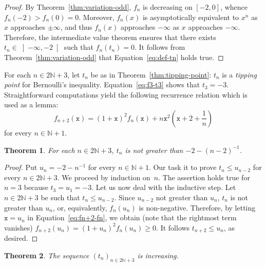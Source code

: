 \documentclass[12pt]{article}
\newcommand{\bN}{\mathbb{N}}
\newcommand{\ltint}[1]{\left]- \infty, #1 \right[}
\newcommand{\ttx}{\mathtt{x}}
\newtheorem{theorem}{Theorem}
\begin{document}
 \begin{proof}
   By Theorem~\ref{thm:variation-odd},  $f_n$ is decreasing on $[- 2, 0]$,
   whence   $f_n(- 2) > f_n(0) = 0$.
   Moreover, $f_n(x)$ is asymptotically equivalent to $x^n$ as $x$ approaches $\pm \infty$,
   and thus $f_n(x)$ approaches $- \infty$ as $x$ approaches $- \infty$.
   Therefore, the intermediate value theorem ensures that there exists $t_n \in \ltint{- 2}$ such that $f_n(t_n) = 0$.
   It follows from Theorem~\ref{thm:variation-odd} that Equation~\eqref{eq:def-tn} holds true.
 \end{proof}

 For each $n \in 2 \bN + 3$,
 let $t_n$ be as in Theorem~\ref{thm:tipping-point}:
 $t_n$ is a \emph{tipping point} for Bernoulli's inequality.
 Equation~\eqref{eq:f3-t3} shows that $t_3 = - 3$. 
 Straightforward computations yield the following recurrence relation which is used as a lemma:
 \begin{equation} \label{eq:fn+2-fn}
   f_{n + 2} (\ttx) = {(1 + \ttx)}^2 f_n(\ttx) + n \ttx^2 \left(\ttx + 2 + \frac{1}{n} \right)
 \end{equation}
 for every $n \in \bN + 1$.
 
 \begin{theorem} \label{thm:HP-upper}
   For each $n \in 2 \bN + 3$, $t_n$ is not greater than $- 2 - {(n - 2)}^{-1}$.
 \end{theorem}

 \begin{proof}
   Put $u_n = - 2 - n^{-1}$ for every $n \in \bN + 1$.
   Our task it to prove $t_n \le u_{n - 2}$ for every $n \in 2 \bN + 3$.
   We proceed by induction on~$n$.
   The assertion holds true for $n = 3$ because $t_3 = u_1 = - 3$.
   Let us now deal with the inductive step.
   Let $n \in 2 \bN + 3$ be such that $t_n \le u_{n - 2}$.
   Since $u_{n - 2}$ not greater than $u_n$, $t_n$ is not greater than $u_n$, or, equivalently, $f_n(u_n)$ is non-negative.
   Therefore,  
   by letting $\ttx = u_n$ in Equation~\eqref{eq:fn+2-fn}, we obtain (note that the rightmost term vanishes)
   $f_{n + 2}(u_n) = {( 1 + u_n )}^2 f_n(u_n) \ge 0$.
   It follows $t_{n + 2} \le u_n$, as desired.
 \end{proof}
 
 
 
\begin{theorem} \label{thm:HP-tn-increase} 
  The sequence $\left( t_n \right)_{n \in 2 \bN + 3}$ is increasing.
 \end{theorem} 
\end{document}

